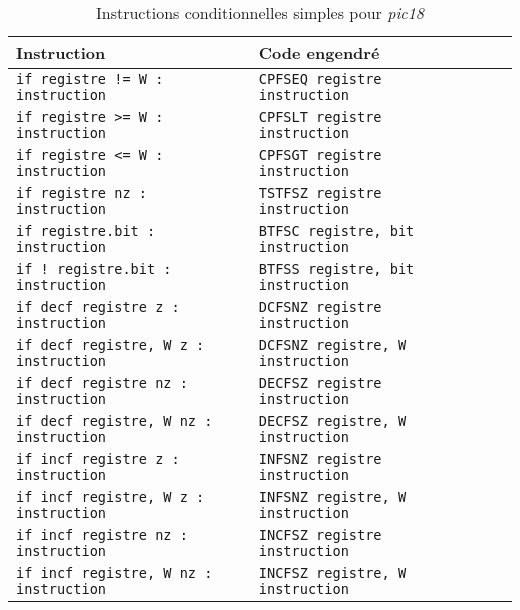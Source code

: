 \begin{table}[!ht]
  \centering
  \small
  \begin{tabular}{lp{4cm}lll}
    \textbf{Instruction} & \textbf{Code engendré}\\
    \hline
    \texttt{if registre != W : instruction} & \texttt{CPFSEQ registre instruction} \\
    \texttt{if registre >= W : instruction} & \texttt{CPFSLT registre instruction} \\
    \texttt{if registre <= W : instruction} & \texttt{CPFSGT registre instruction} \\
    \texttt{if registre nz : instruction} & \texttt{TSTFSZ registre instruction} \\
    \texttt{if registre.bit : instruction} & \texttt{BTFSC registre, bit instruction} \\
    \texttt{if ! registre.bit : instruction} & \texttt{BTFSS registre, bit instruction} \\
    \texttt{if decf registre z : instruction} & \texttt{DCFSNZ registre instruction} \\
    \texttt{if decf registre, W z : instruction} & \texttt{DCFSNZ registre, W instruction} \\
    \texttt{if decf registre nz : instruction} & \texttt{DECFSZ registre instruction} \\
    \texttt{if decf registre, W nz : instruction} & \texttt{DECFSZ registre, W instruction} \\
    \texttt{if incf registre z : instruction} & \texttt{INFSNZ registre instruction} \\
    \texttt{if incf registre, W z : instruction} & \texttt{INFSNZ registre, W instruction} \\
    \texttt{if incf registre nz : instruction} & \texttt{INCFSZ registre instruction} \\
    \texttt{if incf registre, W nz : instruction} & \texttt{INCFSZ registre, W instruction} \\
    \hline
  \end{tabular}
  \caption{Instructions conditionnelles simples pour \emph{pic18}}
\end{table}

